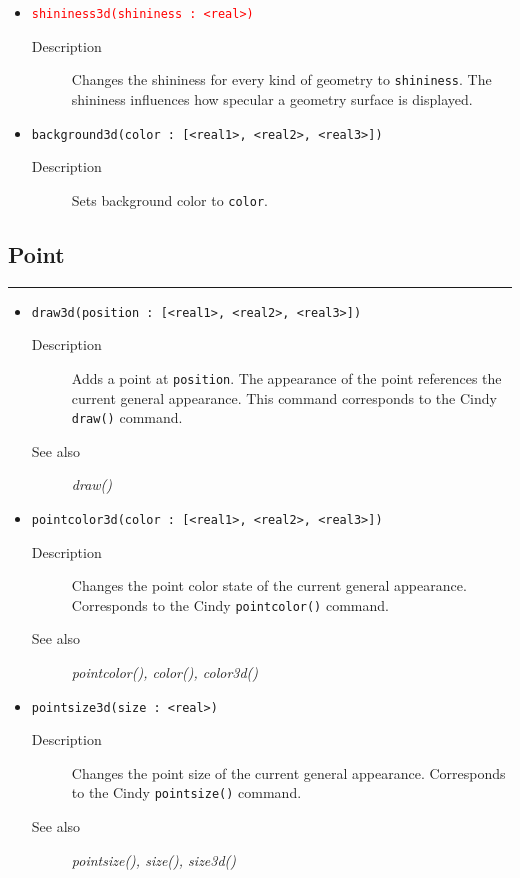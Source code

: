 \documentclass[10pt,a4widepaper]{scrartcl}
\newcommand{\csubsection}[1]{\subsection*{#1}\vspace{-0.55cm}\textcolor{CBlue}{\rule[1ex]{\textwidth}{0.4pt}}}
\newcommand{\cBlue}[1]{\textcolor{CBlue}{\texttt{#1}}}
\newcommand{\cRed}[1]{\textcolor{red}{\texttt{#1}}}
\newcommand{\desc}{\item[Description]}
\newcommand{\salso}{\item[See also]}
\begin{document}
\begin{itemize}
\item \cRed{shininess3d(shininess : <real>)}
\begin{description}
\item[Description] Changes the shininess for every kind of geometry to \texttt{shininess}. The shininess influences how specular a geometry surface is displayed.
\end{description}

\item \cBlue{background3d(color : [<real1>, <real2>, <real3>])}
\begin{description}
\desc Sets background color to \texttt{color}.
\end{description}
\end{itemize}

\csubsection{Point}
\begin{itemize}

\item \cBlue{draw3d(position : [<real1>, <real2>, <real3>])}
\begin{description}
\desc Adds a point at \texttt{position}. The appearance of the point references the current general appearance. This command corresponds to the Cindy \texttt{draw()} command.
\salso \textit{draw()}
\end{description}

\item \cBlue{pointcolor3d(color : [<real1>, <real2>, <real3>])}
\begin{description}
\desc Changes the point color state of the current general appearance. Corresponds to the Cindy \texttt{pointcolor()} command.
\salso \textit{pointcolor(), color(), color3d()}
\end{description}

\item \cBlue{pointsize3d(size : <real>)}
\begin{description}
\desc Changes the point size of the current general appearance. Corresponds to the Cindy \texttt{pointsize()} command.
\salso \textit{pointsize(), size(), size3d()}
\end{description}
\end{itemize}
\end{document}
